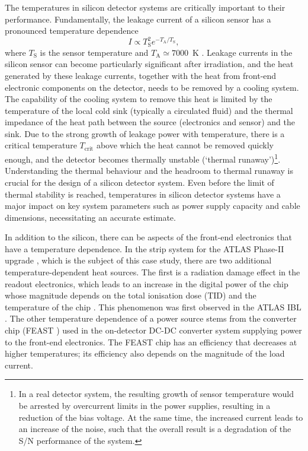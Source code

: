 The temperatures in silicon detector systems are critically important to their performance. Fundamentally, the leakage current of a silicon sensor has a pronounced temperature dependence 
\begin{equation}
I\propto T_\text{S}^2e^{-T_\text{A}/T_\text{S}},
\label{eq:leakage_current_temp_dependence}
\end{equation}
where $T_\text{S}$ is the sensor temperature and $T_\text{A}\simeq7000$~K \cite{Chilingarov_2013}. Leakage currents in the silicon sensor can become particularly significant after irradiation, and the heat generated by these leakage currents, together with the heat from front-end electronic components on the detector, needs to be removed by a cooling system. The capability of the cooling system to remove this heat is limited by the temperature of the local cold sink (typically a circulated fluid) and the thermal impedance of the heat path between the source (electronics and sensor) and the sink. Due to the strong growth of leakage power with temperature, there is a critical temperature $T_\text{crit}$ above which the heat cannot be removed quickly enough, and the detector becomes thermally unstable (`thermal runaway')\footnote{In a real detector system, the resulting growth of sensor temperature would be arrested by overcurrent limits in the power supplies, resulting in a reduction of the bias voltage. At the same time, the increased current leads to an increase of the noise, such that the overall result is a degradation of the S/N performance of the system.}. Understanding the thermal behaviour and the headroom to thermal runaway is crucial for the design of a silicon detector system. Even before the limit of thermal stability is reached, temperatures in silicon detector systems have a major impact on key system parameters such as power supply capacity and cable dimensions, necessitating an accurate estimate.

In addition to the silicon,
there can be aspects of the front-end electronics that have a temperature dependence. In the strip system for the ATLAS Phase-II upgrade \cite{Collaboration:2017mtb}, which is the subject of this case study, there are two additional temperature-dependent heat sources. The first is a radiation damage effect in the readout electronics, which leads to an increase in the digital power of the chip whose magnitude depends on the total ionisation dose (TID) and the temperature of the chip \cite{Collaboration:2017mtb}. This phenomenon was first observed in the ATLAS IBL \cite{ATL-INDET-PUB-2017-001}. The other temperature dependence of a power source stems from the converter chip (FEAST \cite{1748-0221-6-11-C11035,dcdc-info}) used in the on-detector DC-DC converter system supplying power to the front-end electronics. The FEAST chip has an efficiency that decreases at higher temperatures; its efficiency also depends on the magnitude of the load current.


